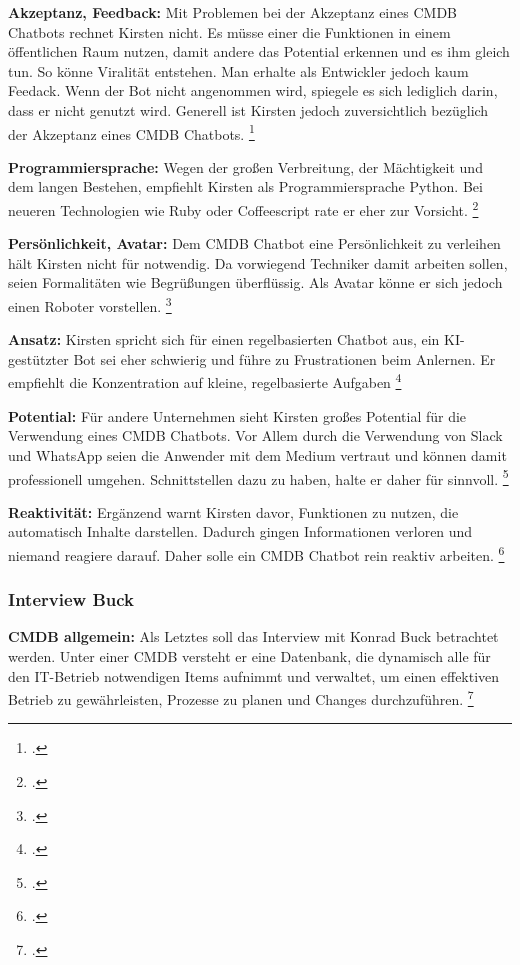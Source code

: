 \textbf{Akzeptanz, Feedback: }Mit Problemen bei der Akzeptanz eines \acs{CMDB} Chatbots rechnet Kirsten nicht. Es müsse einer die Funktionen in einem öffentlichen Raum nutzen, damit andere das Potential erkennen und es ihm gleich tun. So könne Viralität entstehen. Man erhalte als Entwickler jedoch kaum Feedack. Wenn der Bot nicht angenommen wird, spiegele es sich lediglich darin, dass er nicht genutzt wird. Generell ist Kirsten jedoch zuversichtlich bezüglich der Akzeptanz eines \acs{CMDB} Chatbots.
\footcite[Vgl.][o. \pno]{Kirsten_2019}

\textbf{Programmiersprache: }Wegen der großen Verbreitung, der Mächtigkeit und dem langen Bestehen, empfiehlt Kirsten als Programmiersprache Python. Bei neueren Technologien wie Ruby oder Coffeescript rate er eher zur Vorsicht. 
\footcite[Vgl.][o. \pno]{Kirsten_2019}

\textbf{Persönlichkeit, Avatar: }Dem CMDB Chatbot eine Persönlichkeit zu verleihen hält Kirsten nicht für notwendig. Da vorwiegend Techniker damit arbeiten sollen, seien Formalitäten wie Begrüßungen überflüssig. Als Avatar könne er sich jedoch einen Roboter vorstellen. 
\footcite[Vgl.][o. \pno]{Kirsten_2019}

\textbf{Ansatz: }Kirsten spricht sich für einen regelbasierten Chatbot aus, ein KI-gestützter Bot sei eher schwierig und führe zu Frustrationen beim Anlernen. Er empfiehlt die Konzentration auf \glqq{}kleine, regelbasierte Aufgaben\grqq
\footcites[][o. \pno]{Kirsten_2019}[Vgl.][o. \pno]{Kirsten_2019}

\textbf{Potential: }Für andere Unternehmen sieht Kirsten großes Potential für die Verwendung eines \acs{CMDB} Chatbots. Vor Allem durch die Verwendung von Slack und WhatsApp seien die Anwender mit dem Medium vertraut und können damit professionell umgehen. Schnittstellen dazu zu haben, halte er daher für sinnvoll.
\footcite[Vgl.][o. \pno]{Kirsten_2019}

\textbf{Reaktivität: }Ergänzend warnt Kirsten davor, Funktionen zu nutzen, die automatisch Inhalte darstellen. Dadurch gingen Informationen verloren und niemand reagiere darauf. Daher solle ein \acs{CMDB} Chatbot rein reaktiv arbeiten. 
\footcite[Vgl.][o. \pno]{Kirsten_2019}



\subsubsection{Interview Buck}
\textbf{\acs{CMDB} allgemein: }Als Letztes soll das Interview mit Konrad Buck betrachtet werden. Unter einer \acs{CMDB} versteht er eine Datenbank, die dynamisch alle für den IT-Betrieb notwendigen Items aufnimmt und verwaltet, um einen effektiven Betrieb zu gewährleisten, Prozesse zu planen und Changes durchzuführen.
\footcite[Vgl.][o. \pno]{Buck_2019}


